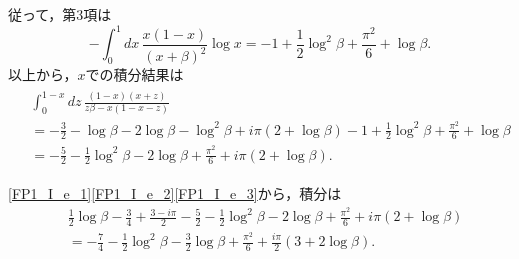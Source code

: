 従って，第3項は
\[ -\int_0^1 dx \, \frac{x(1-x)}{(x+\beta)^2} \log x = - 1 + \frac{1}{2} \log^2 \beta + \frac{\pi^2}{6} + \log \beta . \]
以上から，$x$での積分結果は
\begin{align}
  \begin{split}
    & \int_0^{1-x} dz \, \frac{(1-x)(x+z)}{z\beta - x(1-x-z)} \\
    &= - \frac{3}{2} - \log\beta- 2 \log\beta - \log^2\beta + i\pi (2 + \log\beta) - 1 + \frac{1}{2} \log^2 \beta + \frac{\pi^2}{6} + \log \beta \\
    &= - \frac{5}{2} - \frac{1}{2} \log^2 \beta - 2 \log \beta + \frac{\pi^2}{6} + i\pi (2 + \log\beta) .
  \end{split}
  \label{FP1_I_e_3}
\end{align}

\eqref{FP1_I_e_1}\eqref{FP1_I_e_2}\eqref{FP1_I_e_3}から，積分は
\begin{align*}
  & \frac{1}{2} \log\beta - \frac{3}{4} + \frac{3 - i\pi}{2}
   - \frac{5}{2} - \frac{1}{2} \log^2 \beta - 2 \log \beta + \frac{\pi^2}{6} + i\pi (2 + \log\beta) \\
  &= - \frac{7}{4} - \frac{1}{2} \log^2 \beta - \frac{3}{2} \log\beta + \frac{\pi^2}{6} + \frac{i\pi}{2} (3 + 2\log\beta) .
\end{align*}
